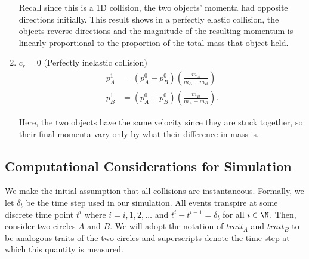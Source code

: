 \documentclass[a4paper,11pt, oneside]{article}
\newcommand{\mtot}{m_A + m_B}
\begin{document}
\begin{enumerate}
Recall since this is a 1D collision, the two objects' momenta had opposite directions initially.  This result shows in a perfectly elastic collision, the objects reverse directions and the magnitude of the resulting momentum is linearly proportional to the proportion of the total mass that object held.

\item $c_r = 0$ (Perfectly inelastic collision)
\begin{align*}
    p_A^1 &= (p_A^0 + p_B^0)\left(\frac{m_A}{\mtot}\right)\\
    p_B^1 &= (p_A^0 + p_B^0)\left(\frac{m_B}{\mtot}\right).
\end{align*}

Here, the two objects have the same velocity since they are stuck together, so their final momenta vary only by what their difference in mass is.



\end{enumerate}



\subsection*{Computational Considerations for Simulation}

We make the initial assumption that all collisions are instantaneous.  Formally, we let $\delta_t$ be the time step used in our simulation.  All events transpire at some discrete time point $t^i$ where $i=i,1,2,\dots$ and $t^i - t^{i-1} = \delta_t$ for all $i\in\N$.  Then, consider two circles $A$ and $B$.  We will adopt the notation of $trait_A$ and $trait_B$ to be analogous traits of the two circles and superscripts denote the time step at which this quantity is measured.
\end{document}
